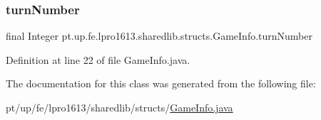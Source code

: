 \subsubsection{\texorpdfstring{turn\+Number}{turnNumber}}
{\footnotesize\ttfamily final Integer pt.\+up.\+fe.\+lpro1613.\+sharedlib.\+structs.\+Game\+Info.\+turn\+Number}



Definition at line 22 of file Game\+Info.\+java.



The documentation for this class was generated from the following file\+:\begin{DoxyCompactItemize}
\item 
pt/up/fe/lpro1613/sharedlib/structs/\hyperlink{_game_info_8java}{Game\+Info.\+java}\end{DoxyCompactItemize}

